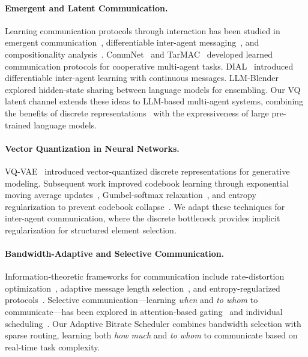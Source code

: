 \documentclass{article}
\begin{document}
\paragraph{Emergent and Latent Communication.}
Learning communication protocols through interaction has been studied in emergent communication~\cite{lazaridou2017multi,havrylov2017emergence}, differentiable inter-agent messaging~\cite{foerster2016learning,sukhbaatar2016learning}, and compositionality analysis~\cite{andreas2019measuring}.
CommNet~\cite{singh2019commnet} and TarMAC~\cite{das2019tarmac} developed learned communication protocols for cooperative multi-agent tasks.
DIAL~\cite{foerster2016learning} introduced differentiable inter-agent learning with continuous messages.
LLM-Blender~\cite{jiang2023llm} explored hidden-state sharing between language models for ensembling.
Our VQ latent channel extends these ideas to LLM-based multi-agent systems, combining the benefits of discrete representations~\cite{oord2017vqvae} with the expressiveness of large pre-trained language models.

\paragraph{Vector Quantization in Neural Networks.}
VQ-VAE~\cite{oord2017vqvae} introduced vector-quantized discrete representations for generative modeling.
Subsequent work improved codebook learning through exponential moving average updates~\cite{razavi2019generating}, Gumbel-softmax relaxation~\cite{jang2017categorical}, and entropy regularization to prevent codebook collapse~\cite{dhariwal2020jukebox}.
We adapt these techniques for inter-agent communication, where the discrete bottleneck provides implicit regularization for structured element selection.

\paragraph{Bandwidth-Adaptive and Selective Communication.}
Information-theoretic frameworks for communication include rate-distortion optimization~\cite{tucker2022trading}, adaptive message length selection~\cite{chaabouni2019anti}, and entropy-regularized protocols~\cite{korbak2022rl}.
Selective communication---learning \emph{when} and \emph{to whom} to communicate---has been explored in attention-based gating~\cite{das2019tarmac} and individual scheduling~\cite{kim2019learning}.
Our Adaptive Bitrate Scheduler combines bandwidth selection with sparse routing, learning both \emph{how much} and \emph{to whom} to communicate based on real-time task complexity.
\end{document}
